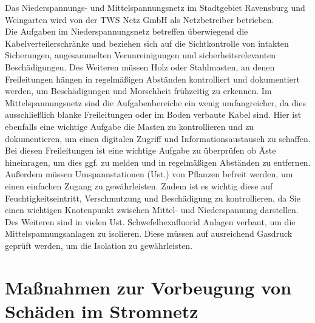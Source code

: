 Das Niederspannungs- und Mittelspannungsnetz im Stadtgebiet Ravensburg und Weingarten wird von der TWS Netz GmbH als Netzbetreiber betrieben. \autocite{Schwab.2012} 
\\
Die Aufgaben im Niederspannungsnetz betreffen überwiegend die Kabelverteilerschränke und beziehen sich auf die Sichtkontrolle von intakten Sicherungen, 
angesammelten Verunreinigungen und sicherheitsrelevanten Beschädigungen. Des Weiteren müssen Holz oder Stahlmasten, an denen Freileitungen hängen in 
regelmäßigen Abständen kontrolliert und dokumentiert werden, um Beschädigungen und Morschheit frühzeitig zu erkennen. Im Mittelspannungsnetz sind die 
Aufgabenbereiche ein wenig umfangreicher, da dies ausschließlich blanke Freileitungen oder im Boden verbaute Kabel sind. Hier ist ebenfalls eine wichtige 
Aufgabe die Masten zu kontrollieren und zu dokumentieren, um einen digitalen Zugriff und Informationsaustausch zu schaffen. Bei diesen Freileitungen ist 
eine wichtige Aufgabe zu überprüfen ob Äste hineinragen, um dies ggf. zu melden und in regelmäßigen Abständen zu entfernen. Außerdem müssen Umspannstationen 
(Ust.) von Pflanzen befreit werden, um einen einfachen Zugang zu gewährleisten. Zudem ist es wichtig diese auf Feuchtigkeitseintritt, Verschmutzung und 
Beschädigung zu kontrollieren, da Sie einen wichtigen Knotenpunkt zwischen Mittel- und Niederspannung darstellen. Des Weiteren sind in vielen Ust. 
Schwefelhexafluorid  Anlagen verbaut, um die Mittelspannungsanlagen zu isolieren. Diese müssen auf ausreichend Gasdruck geprüft werden, um die 
Isolation zu gewährleisten.
\clearpage

\section{Maßnahmen zur Vorbeugung von Schäden im Stromnetz}

